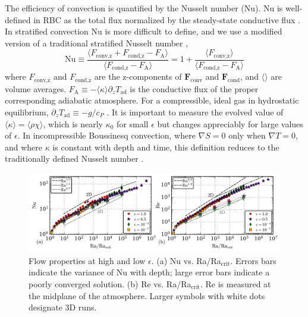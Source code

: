\documentclass[aps, prfluids, onecolumn, notitlepage, nofootinbib, groupedaddress, amsfonts, amssymb, amsmath]{revtex4-1}
\newcommand{\grad}{\ensuremath{\nabla}}
\begin{document}
The efficiency of convection is quantified by the Nusselt number (Nu).  
Nu is well-defined in RBC
as the total flux normalized by the steady-state conductive flux 
\cite{johnston&doering2009, otero&all2002}.
In stratified convection Nu is more difficult to define, and we use
a modified version of a traditional stratified Nusselt number 
\cite{graham1975,hurlburt&all1984},
\begin{equation}
\text{Nu} \equiv \frac{\langle F_{\text{conv,z}} + F_{\text{cond,z}} - F_{\text{A}}\rangle}
{\langle F_{\text{cond,z}} - F_{\text{A}}\rangle} 
= 1 + \frac{\langle F_{\text{conv,z}}\rangle}{\langle F_{\text{cond,z}} - F_{\text{A}} \rangle}
\label{eqn:nusselt}
\end{equation}
where $F_{\text{conv,z}}$ and $F_{\text{cond,z}}$ are the 
z-components of $\bm{F}_{\text{conv}}$ and $\bm{F}_{\text{cond}}$,
and $\langle \rangle$ are volume averages.  
$F_{\text{A}} \equiv -\langle\kappa\rangle \partial_z T_{\text{ad}}$ 
is the conductive flux of the proper corresponding adiabatic atmosphere.
For a compressible, ideal gas in hydrostatic equilibrium,
$\partial_z T_{\text{ad}} \equiv - g / c_{P}$ \cite{spiegel&veronis1960}.  
It is important to measure the evolved value of
$\langle \kappa \rangle = \langle \rho\chi \rangle$, which is nearly
$\kappa_0$ for small $\epsilon$ but changes appreciably for large
values of $\epsilon$.
In incompressible Boussinesq convection, where $\grad S = 0$ only when 
$\grad T = 0$, and where $\kappa$ is constant with depth and time,
this definition reduces to the traditionally defined
Nusselt number \cite{otero&all2002, johnston&doering2009}.
\begin{figure}[t!]
\includegraphics[width=\textwidth]{./figs/re_and_nu_v_Ra.png}
\caption{
Flow properties at high and low $\epsilon$. 
(a) Nu vs. Ra/Ra$_{\text{crit}}$.
Errors bars indicate the variance of Nu with depth;
large error bars indicate a poorly converged solution.
(b) Re vs. Ra/Ra$_{\text{crit}}$.
Re is measured at the midplane of the atmosphere.
Larger symbols with white dots designate 3D runs.
 \label{fig:re_and_nu_v_ra}
}
\end{figure}
\end{document}
